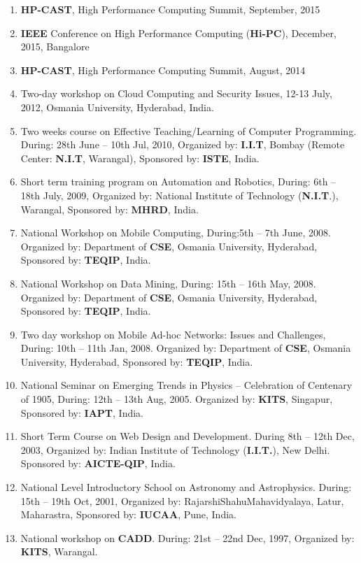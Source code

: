 \begin{enumerate}

\item
\textbf{HP-CAST}, High Performance Computing Summit, September, 2015

\item
\textbf{IEEE} Conference on High Performance Computing (\textbf{Hi-PC}), December, 2015, Bangalore

\item
\textbf{HP-CAST}, High Performance Computing Summit, August, 2014

\item
Two-day workshop on Cloud Computing and Security Issues, 12-13 July, 2012, Osmania University, Hyderabad, India.

\item
Two weeks course on Effective Teaching/Learning of Computer Programming. During: 28th June – 10th Jul, 2010, Organized by:\textbf{ I.I.T}, Bombay (Remote Center:\textbf{ N.I.T}, Warangal), Sponsored by: \textbf{ISTE}, India.

\item
Short term training program on Automation and Robotics, During: 6th – 18th July, 2009, Organized by: National Institute of Technology (\textbf{N.I.T}.), Warangal, Sponsored by: \textbf{MHRD}, India. 

\item
National Workshop on Mobile Computing, During:5th – 7th June, 2008. Organized by: Department of \textbf{CSE}, Osmania University, Hyderabad, Sponsored by: \textbf{TEQIP}, India. 

\item
National Workshop on Data Mining, During: 15th – 16th May, 2008. Organized by: Department of \textbf{CSE}, Osmania University, Hyderabad, Sponsored by: \textbf{TEQIP}, India. 

\item
Two day workshop on Mobile Ad-hoc Networks: Issues and Challenges, During: 10th – 11th Jan, 2008. Organized by: Department of \textbf{CSE}, Osmania University, Hyderabad, Sponsored by: \textbf{TEQIP}, India. 

\item
National Seminar on Emerging Trends in Physics – Celebration of Centenary of 1905, During: 12th – 13th Aug, 2005. Organized by: \textbf{KITS}, Singapur, Sponsored by: \textbf{IAPT}, India.

\item
Short Term Course on Web Design and Development. During 8th – 12th Dec, 2003, Organized by: Indian Institute of Technology (\textbf{I.I.T.}), New Delhi. Sponsored by: \textbf{AICTE-QIP}, India. 

\item
National Level Introductory School on Astronomy and Astrophysics. During: 15th – 19th Oct, 2001, Organized by: RajarshiShahuMahavidyalaya, Latur, Maharastra, Sponsored by: \textbf{IUCAA}, Pune, India.

\item
National workshop on \textbf{CADD}. During: 21st – 22nd Dec, 1997, Organized by: \textbf{KITS}, Warangal.

\end{enumerate}